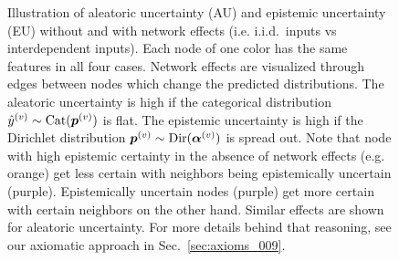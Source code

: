 \begin{figure}[!h]
	\caption{Illustration of aleatoric uncertainty (AU) and epistemic uncertainty (EU) without and with network effects (i.e. i.i.d.\ inputs vs interdependent inputs). Each node of one color has the same features in all four cases. Network effects are visualized through edges between nodes which change the predicted distributions. The aleatoric uncertainty is high if the categorical distribution $\hat{y} ^{(v)} \sim \operatorname{Cat}(\bm{p}^{(v)})$ is flat. The epistemic uncertainty is high if the Dirichlet distribution $\bm{p}^{(v)} \sim \operatorname{Dir}(\bm{\alpha}^{(v)})$ is spread out. Note that node with high epistemic certainty in the absence of network effects (e.g. orange) get less certain with neighbors being epistemically uncertain (purple). Epistemically uncertain nodes (purple) get more certain with certain neighbors on the other hand. Similar effects are shown for aleatoric uncertainty. For more details behind that reasoning, see our axiomatic approach in Sec.~\ref{sec:axioms_009}.}
    \label{fig:uncertainty_types_large}
\end{figure}

\clearpage